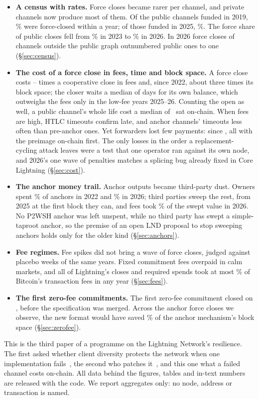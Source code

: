 \begin{itemize}
\item \textbf{A census with rates.} Force closes became rarer per channel, and private channels now produce most of
them. Of the public channels funded in 2019, \CohortOneYearNineteen\% were force-closed within a year; of those
funded in 2025, \CohortOneYearTwentyFive\%. The force share of public closes fell from \ForceShareTwentyThree\% in
2023 to \ForceShareTwentySix\% in 2026. In 2026 force closes of channels outside the public graph outnumbered public
ones \UnlOverPubTwentySix{} to one (\S\ref{sec:census}).
\item \textbf{The cost of a force close in fees, time and block space.} A force close costs
\CostRatioMin--\CostRatioMax{} times a cooperative close in fees and, since 2022, about three times its block space; the
closer waits a median of \ToLocalMedDays{} days for its own balance, which outweighs the fees only in the low-fee
years 2025--26. Counting the open as well, a public channel's whole life cost a median of \LcMed{}~sat on-chain. When
fees are high, HTLC timeouts confirm late, and anchor channels' timeouts less often than pre-anchor ones. Yet
forwarders lost few payments: \SplitResForwarderPayments{} since \SplitResFromYear, all with the preimage on-chain
first. The only losses in the order a replacement-cycling attack leaves were a test that one operator ran against its
own node, and 2026's one wave of penalties matches a splicing bug already fixed in Core Lightning
(\S\ref{sec:cost}).
\item \textbf{The anchor money trail.} Anchor outputs became third-party dust. Owners spent
\OwnerPctTwentyTwo\% of anchors in 2022 and \OwnerPctTwentySix\% in 2026; third parties sweep the rest, from 2025 at
the first block they can, and fees took \MinersShareTwentySix\% of the swept value in 2026. No P2WSH anchor was left
unspent, while no third party has swept a simple-taproot anchor, so the premise of an open LND proposal to stop
sweeping anchors holds only for the older kind (\S\ref{sec:anchors}).
\item \textbf{Fee regimes.} Fee spikes did not bring a wave of force closes, judged against placebo weeks of
the same years. Fixed commitment fees overpaid in calm
markets, and all of Lightning's closes and required spends took at most
\BillFeePctMax\% of Bitcoin's transaction fees in any year (\S\ref{sec:fees}).
\item \textbf{The first zero-fee commitments.} The first zero-fee commitment closed on \ZfFirst, before the
specification was merged. Across the anchor force closes we observe, the new format would have saved
\CfSavingPct\% of the anchor mechanism's block space (\S\ref{sec:zerofee}).
\end{itemize}

This is the third paper of a programme on the Lightning Network's resilience. The first asked whether client diversity
protects the network when one implementation fails~\cite{kumar2026clientdiversity}, the second who patches
it~\cite{kumar2026upgradedynamics}, and this one what a failed channel costs on-chain. All data behind the figures,
tables and in-text numbers are released with the code. We report aggregates only: no node, address or transaction is
named.
